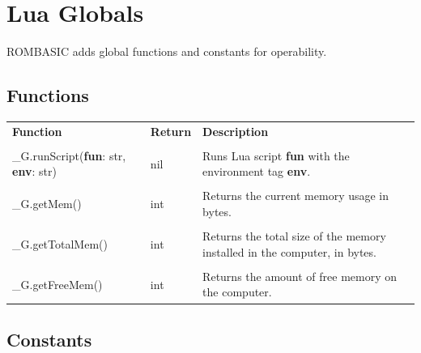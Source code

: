 \documentclass[10pt, stock]{memoir}
\newcommand{\unemph}[1]{\textcolor{brightgrey}{#1}}
\let\oldsection\section
\renewcommand\section{\clearpage\oldsection}
\begin{document}
\section{Lua Globals}

ROMBASIC adds global functions and constants for operability.

\subsection{Functions}

\begin{tabularx}{\textwidth}{l l X}
	\textbf{\large Function} & \textbf{\large Return} & \textbf{\large Description}
	\\ \\
	\endhead
	\unemph{\_G.}runScript(\textbf{fun}: str, \textbf{env}: str) & nil & Runs Lua script \textbf{fun} with the environment tag \textbf{env}.
	\\ \\
	\unemph{\_G.}getMem() & int & Returns the current memory usage in bytes.
	\\ \\
	\unemph{\_G.}getTotalMem() & int & Returns the total size of the memory installed in the computer, in bytes.
	\\ \\
	\unemph{\_G.}getFreeMem() & int & Returns the amount of free memory on the computer.
\end{tabularx}

\subsection{Constants}
\end{document}
